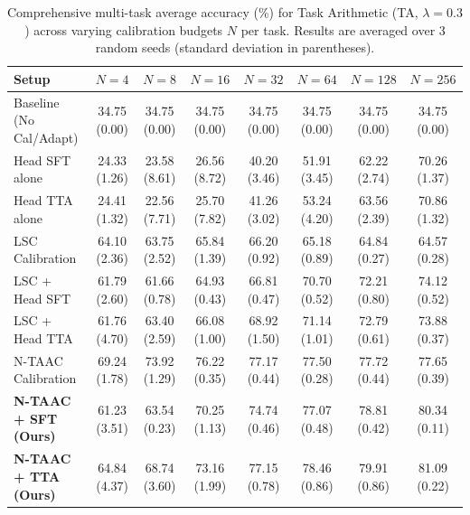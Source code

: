 \begin{table}[ht]
\centering
\caption{Comprehensive multi-task average accuracy (\%) for Task Arithmetic (TA, $\lambda=0.3$) across varying calibration budgets $N$ per task. Results are averaged over 3 random seeds (standard deviation in parentheses).}
\label{tab:appendix_ta_03}
\vskip 0.15in
\begin{sc}
\begin{scriptsize}
\setlength{\tabcolsep}{3pt}
\begin{tabular}{lccccccc}
\toprule
Setup & $N=4$ & $N=8$ & $N=16$ & $N=32$ & $N=64$ & $N=128$ & $N=256$ \\
\midrule
Baseline (No Cal/Adapt) & 34.75 (0.00) & 34.75 (0.00) & 34.75 (0.00) & 34.75 (0.00) & 34.75 (0.00) & 34.75 (0.00) & 34.75 (0.00) \\
Head SFT alone & 24.33 (1.26) & 23.58 (8.61) & 26.56 (8.72) & 40.20 (3.46) & 51.91 (3.45) & 62.22 (2.74) & 70.26 (1.37) \\
Head TTA alone & 24.41 (1.32) & 22.56 (7.71) & 25.70 (7.82) & 41.26 (3.02) & 53.24 (4.20) & 63.56 (2.39) & 70.86 (1.32) \\
LSC Calibration & 64.10 (2.36) & 63.75 (2.52) & 65.84 (1.39) & 66.20 (0.92) & 65.18 (0.89) & 64.84 (0.27) & 64.57 (0.28) \\
LSC + Head SFT & 61.79 (2.60) & 61.66 (0.78) & 64.93 (0.43) & 66.81 (0.47) & 70.70 (0.52) & 72.21 (0.80) & 74.12 (0.52) \\
LSC + Head TTA & 61.76 (4.70) & 63.40 (2.59) & 66.08 (1.00) & 68.92 (1.50) & 71.14 (1.01) & 72.79 (0.61) & 73.88 (0.37) \\
N-TAAC Calibration & 69.24 (1.78) & 73.92 (1.29) & 76.22 (0.35) & 77.17 (0.44) & 77.50 (0.28) & 77.72 (0.44) & 77.65 (0.39) \\
\textbf{N-TAAC + SFT (Ours)} & 61.23 (3.51) & 63.54 (0.23) & 70.25 (1.13) & 74.74 (0.46) & 77.07 (0.48) & 78.81 (0.42) & 80.34 (0.11) \\
\textbf{N-TAAC + TTA (Ours)} & 64.84 (4.37) & 68.74 (3.60) & 73.16 (1.99) & 77.15 (0.78) & 78.46 (0.86) & 79.91 (0.86) & 81.09 (0.22) \\
\bottomrule
\end{tabular}
\end{scriptsize}
\end{sc}
\end{table}

